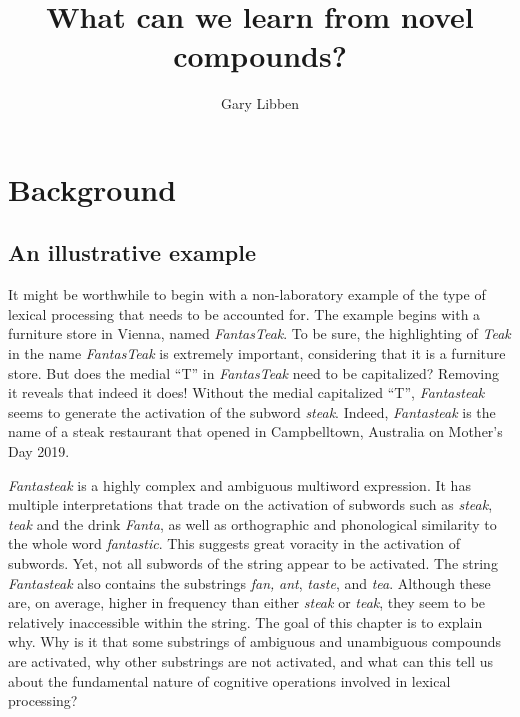 \documentclass[output=paper]{langsci/langscibook}
\title{What can we learn from novel compounds?}
\author{Gary Libben\affiliation{Brock University}}
\begin{document}
\maketitle

\section{Background}\label{sec:libben:1}

\subsection{An illustrative example}\label{sec:libben:1.1}

It might be worthwhile to begin with a non-laboratory example of the type of lexical processing that needs to be accounted for.   The example begins with a furniture store in Vienna, named \textit{FantasTeak}.  To be sure, the highlighting of \textit{Teak} in the name \textit{FantasTeak} is extremely important, considering that it is a furniture store. But does the medial “T” in \textit{FantasTeak} need to be capitalized?  Removing it reveals that indeed it does!  Without the medial capitalized “T”, \textit{Fantasteak} seems to generate the activation of the subword \textit{steak}. Indeed, \textit{Fantasteak} is the name of a steak restaurant that opened in Campbelltown, Australia on Mother’s Day 2019. 

\textit{Fantasteak} is a highly complex and ambiguous multiword expression. It has multiple interpretations that trade on the activation of subwords such as \textit{steak}, \textit{teak} and the drink \textit{Fanta}, as well as orthographic and phonological similarity to the whole word \textit{fantastic}.  This suggests great voracity in the activation of subwords. Yet, not all subwords of the string appear to be activated. The string \textit{Fantasteak} also contains the substrings \textit{fan,} \textit{ant}, \textit{taste}, and \textit{tea}.  Although these are, on average, higher in frequency than either \textit{steak} or \textit{teak}, they seem to be relatively inaccessible within the string. The goal of this chapter is to explain why.  Why is it that some substrings of ambiguous and unambiguous compounds are activated, why other substrings are not activated, and what can this tell us about the fundamental nature of cognitive operations involved in lexical processing?
\end{document}
